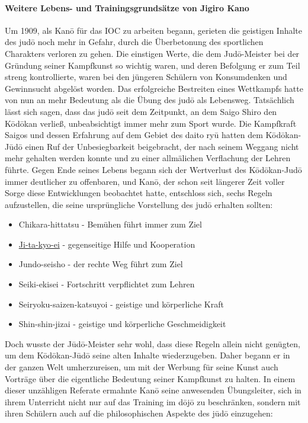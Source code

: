 \documentclass[justified, a4paper, notitlepage, captions=tableheading, nobib]{tufte-handout}
\begin{document}
\paragraph{Weitere Lebens- und Trainingsgrundsätze von Jigiro Kano}
\label{sec:orgf14d206}
Um 1909, als Kanō für das IOC zu arbeiten begann, gerieten die geistigen Inhalte des judō noch mehr in Gefahr, durch die Überbetonung des sportlichen Charakters verloren zu gehen. Die einstigen Werte, die dem Judō-Meister bei der Gründung seiner Kampfkunst so wichtig waren, und deren Befolgung er zum Teil streng kontrollierte, waren bei den jüngeren Schülern von Konsumdenken und Gewinnsucht abgelöst worden. Das erfolgreiche Bestreiten eines Wettkampfs hatte von nun an mehr Bedeutung als die Übung des judō als Lebensweg. Tatsächlich lässt sich sagen, dass das judō seit dem Zeitpunkt, an dem Saigo Shiro den Kōdōkan verließ, unbeabsichtigt immer mehr zum Sport wurde. Die Kampfkraft Saigos und dessen Erfahrung auf dem Gebiet des daito ryū hatten dem Kōdōkan-Jūdō einen Ruf der Unbesiegbarkeit beigebracht, der nach seinem Weggang nicht mehr gehalten werden konnte und zu einer allmälichen Verflachung der Lehren führte. Gegen Ende seines Lebens begann sich der Wertverlust des Kōdōkan-Judō immer deutlicher zu offenbaren, und Kanō, der schon seit längerer Zeit voller Sorge diese Entwicklungen beobachtet hatte, entschloss sich, sechs Regeln aufzustellen, die seine ursprüngliche Vorstellung des judō erhalten sollten:

\begin{itemize}
\item Chikara-hittatsu - Bemühen führt immer zum Ziel
\item \hyperref[orgc231618]{Ji-ta-kyo-ei} - gegenseitige Hilfe und Kooperation
\item Jundo-seisho - der rechte Weg führt zum Ziel
\item Seiki-ekisei - Fortschritt verpflichtet zum Lehren
\item Seiryoku-saizen-katsuyoi - geistige und körperliche Kraft
\item Shin-shin-jizai - geistige und körperliche Geschmeidigkeit
\end{itemize}

Doch wusste der Jūdō-Meister sehr wohl, dass diese Regeln allein nicht genügten, um dem Kōdōkan-Jūdō seine alten Inhalte wiederzugeben. Daher begann er in der ganzen Welt umherzureisen, um mit der Werbung für seine Kunst auch Vorträge über die eigentliche Bedeutung seiner Kampfkunst zu halten. In einem dieser unzähligen Referate ermahnte Kanō seine anwesenden Übungsleiter, sich in ihrem Unterricht nicht nur auf das Training im dōjō zu beschränken, sondern mit ihren Schülern auch auf die philosophischen Aspekte des jūdō einzugehen:
\end{document}
